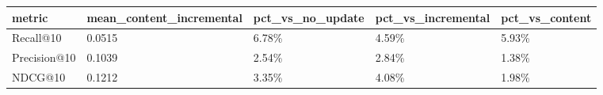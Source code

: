 \begin{tabular}{lllll}
\toprule
metric & mean_content_incremental & pct_vs_no_update & pct_vs_incremental & pct_vs_content \\
\midrule
Recall@10 & 0.0515 & 6.78\% & 4.59\% & 5.93\% \\
Precision@10 & 0.1039 & 2.54\% & 2.84\% & 1.38\% \\
NDCG@10 & 0.1212 & 3.35\% & 4.08\% & 1.98\% \\
\bottomrule
\end{tabular}
